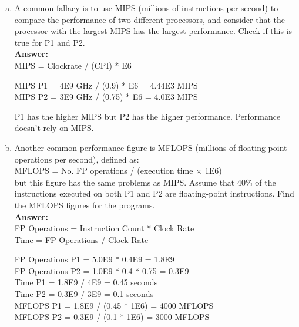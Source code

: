 \documentclass[12pt]{article}
\begin{document}
\begin{enumerate}[(a)]
    \item A common fallacy is to use MIPS (millions of instructions per second) to compare the performance of two different processors, and consider that the processor with the largest MIPS has the largest performance. Check if this is true for P1 and P2.
    \\
    \textbf{Answer:}
    \\
    MIPS = Clockrate / (CPI) * E6
    \begin{center}
        MIPS P1 = 4E9 GHz / (0.9) * E6 = 4.44E3 MIPS\\
        MIPS P2 = 3E9 GHz / (0.75) * E6 = 4.0E3 MIPS\\
    \end{center}

    P1 has the higher MIPS but P2 has the higher performance. Performance doesn't rely on MIPS.
    \item  Another common performance figure is MFLOPS (millions of floating-point operations per second), defined as:\\MFLOPS = No. FP operations / (execution time × 1E6)\\but this figure has the same problems as MIPS. Assume that 40\% of the instructions executed on both P1 and P2 are floating-point instructions. Find the MFLOPS figures for the programs.
    \\
    \textbf{Answer:}
    \\
    FP Operations = Instruction Count * Clock Rate\\
    Time = FP Operations / Clock Rate
    \begin{center}
        FP Operations P1 = 5.0E9 * 0.4E9 = 1.8E9\\
        FP Operations P2 = 1.0E9 * 0.4 * 0.75 = 0.3E9\\[0.15in]
        Time P1 = 1.8E9 / 4E9 = 0.45 seconds\\
        Time P2 = 0.3E9 / 3E9 = 0.1 seconds\\[0.15in]
        MFLOPS P1 = 1.8E9 / (0.45 * 1E6) = 4000 MFLOPS\\
        MFLOPS P2 = 0.3E9 / (0.1 * 1E6) = 3000 MFLOPS\\
    \end{center}
\end{enumerate}


\end{document}
